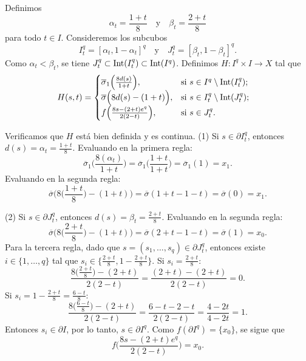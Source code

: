 \begin{dem}
\begin{center}
\begin{tikzpicture}[scale=0.65, thick]
    \end{tikzpicture}
\end{center}
Definimos
    \[
        \alpha_t = \frac{1+t}{8} \quad \text{y} \quad \beta_t = \frac{2+t}{8}
    \]
    para todo $t \in I$. Consideremos los subcubos 
    \[
        I_t^q = [\alpha_t, 1-\alpha_t]^q \quad \text{y} \quad J_t^q = [\beta_t, 1-\beta_t]^q.
    \]
    Como $\alpha_t < \beta_t$, se tiene $J_t^q \subset \mathrm{Int}(I_t^q) \subset \mathrm{Int}(I^q)$. Definimos $H: I^q \times I \to X$ tal que
    \begin{align*}
        H(s, t) &= 
        \begin{cases}
            \overline{\sigma}_1\Big( \frac{8d(s)}{1+t} \Big), & \text{si } s \in I^q \setminus \mathrm{Int}(I_t^q); \\
            \overline{\sigma}\Big( 8d(s) - (1+t) \Big), & \text{si } s \in I_t^q \setminus \mathrm{Int}(J_t^q); \\
            f\Big( \frac{8s - (2+t)e^q}{2(2-t)} \Big), & \text{si } s \in J_t^q.
        \end{cases}
    \end{align*}
    
    Verificamos que $H$ está bien definida y es continua. (1) Si $s\in\partial I_t^q$, entonces $d(s) = \alpha_t = \frac{1+t}{8}$. 
    Evaluando en la primera regla:
    \[
        \overline{\sigma}_1\Big( \frac{8(\alpha_t)}{1+t} \Big) = \overline{\sigma}_1\Big(\frac{1+t}{1+t}\Big) = \overline{\sigma}_1(1) =x_1.
    \]
    Evaluando en la segunda regla:
    \[
        \overline{\sigma}\Big( 8\Big(\frac{1+t}{8}\Big) - (1+t) \Big) = \overline{\sigma}(1+t - 1-t) = \overline{\sigma}(0) = x_1.
    \]

    (2) Si $s\in \partial J_t^q$, entonces $d(s) = \beta_t = \frac{2+t}{8}$. 
    Evaluando en la segunda regla:
    \[
        \overline{\sigma}\Big( 8\Big(\frac{2+t}{8}\Big) - (1+t) \Big) = \overline{\sigma}(2+t - 1-t) = \overline{\sigma}(1) = x_0.
    \]
    Para la tercera regla, dado que $s=(s_1,\ldots,s_q) \in \partial J_t^q$, entonces existe $i\in\{1,\ldots,q\}$ tal que $s_i \in \big\{\frac{2+t}{8}, 1-\frac{2+t}{8}\big\}$. Si $s_i = \frac{2+t}{8}$:
    \[
        \frac{8\big(\frac{2+t}{8}\big) - (2+t)}{2(2-t)} = \frac{(2+t) - (2+t)}{2(2-t)} = 0.
    \]
    Si $s_i = 1-\frac{2+t}{8} = \frac{6-t}{8}$:
    \[
        \frac{8\big(\frac{6-t}{8}\big) - (2+t)}{2(2-t)} = \frac{6-t - 2-t}{2(2-t)} = \frac{4-2t}{4-2t} = 1.
    \]
    Entonces $s_i\in\partial I$, por lo tanto, $s\in\partial I^q$. Como $f(\partial I^q) = \{x_0\}$, se sigue que 
    \begin{equation*}
       \textstyle f\Big( \frac{8s - (2+t)e^q}{2(2-t)} \Big)=x_0.
    \end{equation*}


\end{dem}
